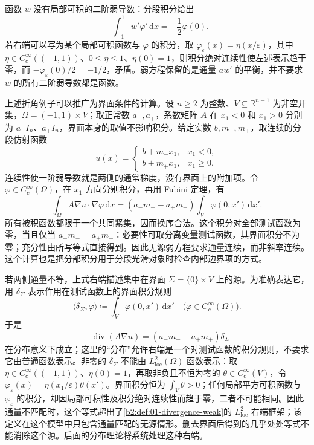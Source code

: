 函数 \(w\) 没有局部可积的二阶弱导数：分段积分给出
\[
-\int_{-1}^1 w'\varphi'\,\mathrm{d}x=-\frac12\varphi(0).
\]
若右端可以写为某个局部可积函数与 \(\varphi\) 的积分，取 \(\varphi_\varepsilon(x)=\eta(x/\varepsilon)\)，其中 \(\eta\in C_c^\infty((-1,1))\)、\(0\leq\eta\leq1\)、\(\eta(0)=1\)，则积分绝对连续性使左述表示趋于零，而 \(-\varphi_\varepsilon(0)/2=-1/2\)，矛盾。弱方程保留的是通量 \(aw'\) 的平衡，并不要求 \(w\) 的所有二阶弱导数都是函数。

\ProseParagraphBreak

上述折角例子可以推广为界面条件的计算。设 \(n\geq2\) 为整数、\(V\subseteq\mathbb R^{n-1}\) 为非空开集，\(\Omega=(-1,1)\times V\)；取正常数 \(a_-,a_+\)，系数矩阵 \(A\) 在 \(x_1<0\) 和 \(x_1>0\) 分别为 \(a_-I_n\)、\(a_+I_n\)，界面本身的取值不影响积分。给定实数 \(b,m_-,m_+\)，取连续的分段仿射函数
\[
 u(x)=\begin{cases}b+m_-x_1,&x_1<0,\\b+m_+x_1,&x_1\geq0.\end{cases}
\]
连续性使一阶弱导数就是两侧的通常梯度，没有界面上的附加项。令 \(\varphi\in C_c^\infty(\Omega)\)，在 \(x_1\) 方向分别积分，再用 Fubini 定理，有
\[
 \int_\Omega A\nabla u\cdot\nabla\varphi\,\mathrm dx
 =(a_-m_--a_+m_+)\int_V\varphi(0,x')\,\mathrm dx'.
\]
所有被积函数都限于一个共同紧集，因而换序合法。这个积分对全部测试函数为零，当且仅当 \(a_-m_-=a_+m_+\)：必要性可取分离变量测试函数，其界面积分不为零；充分性由所写等式直接得到。因此无源弱方程要求通量连续，而非斜率连续。这个计算也是把分部积分用于分段光滑对象时检查内部边界项的方式。

\ProseParagraphBreak

若两侧通量不等，上式右端描述集中在界面 \(\Sigma=\{0\}\times V\) 上的源。为准确表达它，用 \(\delta_\Sigma\) 表示作用在测试函数上的界面积分规则
\[
 \langle\delta_\Sigma,\varphi\rangle\coloneqq
 \int_V\varphi(0,x')\,\mathrm dx'
 \quad\bigl(\varphi\in C_c^\infty(\Omega)\bigr).
\]
于是
\[
 -\operatorname{div}(A\nabla u)
 =(a_-m_--a_+m_+)\delta_\Sigma
\]
在分布意义下成立；这里的“分布”允许右端是一个对测试函数的积分规则，不要求它由普通函数表示。非零的 \(\delta_\Sigma\) 不能由 \(L^2_{\mathrm{loc}}(\Omega)\) 函数表示：取 \(\eta\in C_c^\infty((-1,1))\)、\(\eta(0)=1\)，再取非负且不恒为零的 \(\theta\in C_c^\infty(V)\)，令 \(\varphi_\varepsilon(x)=\eta(x_1/\varepsilon)\theta(x')\)。界面积分恒为 \(\int_V\theta>0\)；任何局部平方可积函数与 \(\varphi_\varepsilon\) 的积分，却因局部可积性及积分绝对连续性而趋于零，二者不可能相同。因此通量不匹配时，这个等式超出了\cref{b2:def:01-divergence-weak}的 \(L^2_{\mathrm{loc}}\) 右端框架；该定义在这个模型中只包含通量匹配的无源情形。删去界面后得到的几乎处处等式不能消除这个源。后面的分布理论将系统处理这种右端。

